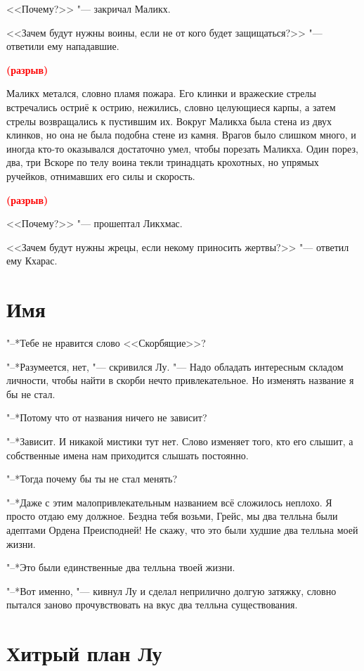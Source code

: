 \documentclass[a4paper,10pt]{book}
\newcommand{\ldotst}{\so{...}\xspace}
\newcommand{\spacing}{\textcolor{red}{\textbf{(разрыв)}}}
\begin{document}
<<Почему?>> "--- закричал Маликх.

<<Зачем будут нужны воины, если не от кого будет защищаться?>> "--- ответили 
ему нападавшие.

\spacing

Маликх метался, словно пламя пожара. Его клинки и вражеские стрелы встречались 
остриё к острию, нежились, словно целующиеся карпы, а затем стрелы возвращались 
к пустившим их. Вокруг Маликха была стена из двух клинков, но она не была 
подобна стене из камня. Врагов было слишком много, и иногда кто-то оказывался 
достаточно умел, чтобы порезать Маликха. Один порез, два, три\ldotst Вскоре по 
телу воина текли тринадцать крохотных, но упрямых ручейков, отнимавших его силы 
и скорость.

\spacing

<<Почему?>> "--- прошептал Ликхмас.

<<Зачем будут нужны жрецы, если некому приносить жертвы?>> "--- ответил ему 
Кхарас.

\section{Имя}

"--*Тебе не нравится слово <<Скорбящие>>?

"--*Разумеется, нет, "--- скривился Лу. "--- Надо обладать интересным складом 
личности, чтобы найти в скорби нечто привлекательное. Но
изменять название я бы не стал.

"--*Потому что от названия ничего не зависит?

"--*Зависит. И никакой мистики тут нет. Слово изменяет того, кто его слышит, а 
собственные имена нам приходится слышать постоянно.

"--*Тогда почему бы ты не стал менять?

"--*Даже с этим малопривлекательным названием всё сложилось неплохо. Я просто 
отдаю ему должное. Бездна тебя возьми, Грейс, мы два телльна были адептами 
Ордена Преисподней!
Не скажу, что это были худшие два телльна моей жизни.

"--*Это были единственные два телльна твоей жизни.

"--*Вот именно, "--- кивнул Лу и сделал неприлично долгую затяжку, словно 
пытался заново
прочувствовать на вкус два телльна существования.

\section{Хитрый план Лу}
\end{document}
